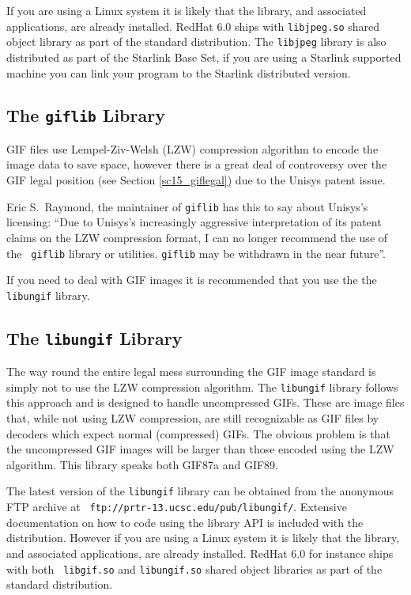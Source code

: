\documentclass[twoside,11pt]{article}
\newcommand{\htmladdnormallink}[2]{#1}
\newcommand{\htmlref}[2]{#1}
\newcommand{\latex}[1]{#1}
\newcommand{\xlabel}[1]{}
\begin{document}
If you are using a Linux system it is likely that the library, and
associated applications, are already installed. RedHat 6.0 ships with
{\tt libjpeg.so} shared object library as part of the standard
distribution. The {\tt libjpeg} library is also distributed as part of
the Starlink Base Set, if you are using a Starlink supported machine
you can link your program to the Starlink distributed version.

\subsection{\xlabel{sc15_libgif}The {\tt giflib} Library\label{sc15_libgif}}

GIF files use Lempel-Ziv-Welsh (LZW) compression algorithm to encode
the image data to save space, however there is a great deal of
controversy over the GIF \htmlref{legal position}{sc15_giflegal}
\latex{(see Section \ref{sc15_giflegal})} due to the Unisys patent
issue. 

Eric S.\ Raymond, the maintainer of {\tt giflib} has this to say about
Unisys's licensing: ``Due to Unisys's increasingly aggressive
interpretation of its \htmlref{patent claims}{sc15_giflegal} on the
LZW compression format, I can no longer recommend the use of the {\tt
giflib} library or utilities. {\tt giflib} may be withdrawn in the
near future''.

If you need to deal with GIF images it is recommended that you use the
the \htmlref{{\tt libungif}}{sc15_libungif} library.

\subsection{\xlabel{sc15_libungif}The {\tt libungif} Library\label{sc15_libungif}}

The way round the entire \htmlref{legal mess}{sc15_giflegal}
surrounding the GIF image standard is simply not to use the LZW
compression algorithm. The {\tt libungif} library follows this
approach and is designed to handle uncompressed GIFs. These are image
files that, while not using LZW compression, are still recognizable as
GIF files by decoders which expect normal (compressed) GIFs. The
obvious problem is that the uncompressed GIF images will be larger
than those encoded using the LZW algorithm. This library speaks both
GIF87a and GIF89. 

The latest version of the {\tt libungif} library can be obtained from
the anonymous FTP archive at \htmladdnormallink{{\tt
ftp://prtr-13.ucsc.edu/pub/libungif/}}{ftp://prtr-13.ucsc.edu/pub/libungif/}.
Extensive documentation on how to code using the library API is
included with the distribution. However if you are using a Linux
system it is likely that the library, and associated applications, are
already installed. RedHat 6.0 for instance ships with both {\tt
libgif.so} and {\tt libungif.so} shared object libraries as part of
the standard distribution.
\end{document}
